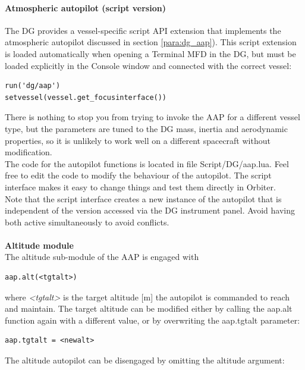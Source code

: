 \documentclass[Orbiter User Manual.tex]{subfiles}
\begin{document}
\paragraph{Atmospheric autopilot (script version)}
The DG provides a vessel-specific script API extension that implements the atmospheric autopilot discussed in section \ref{para:dg_aap}). This script extension is loaded automatically when opening a Terminal MFD in the DG, but must be loaded explicitly in the Console window and connected with the correct vessel:

\begin{lstlisting}[language=OSFS]
run('dg/aap')
setvessel(vessel.get_focusinterface())
\end{lstlisting}

\noindent
There is nothing to stop you from trying to invoke the AAP for a different vessel type, but the parameters are tuned to the DG mass, inertia and aerodynamic properties, so it is unlikely to work well on a different spacecraft without modification.\\
The code for the autopilot functions is located in file Script/DG/aap.lua. Feel free to edit the code to modify the behaviour of the autopilot. The script interface makes it easy to change things and test them directly in Orbiter.\\
Note that the script interface creates a new instance of the autopilot that is independent of the version accessed via the DG instrument panel. Avoid having both active simultaneously to avoid conflicts.\\
\\
\textbf{Altitude module}\\
The altitude sub-module of the AAP is engaged with

\begin{lstlisting}[language=OSFS]
aap.alt(<tgtalt>)
\end{lstlisting}

\noindent
where \textit{<tgtalt>} is the target altitude [m] the autopilot is commanded to reach and maintain. The target altitude can be modified either by calling the aap.alt function again with a different value, or by overwriting the aap.tgtalt parameter:

\begin{lstlisting}[language=OSFS]
aap.tgtalt = <newalt>
\end{lstlisting}

\noindent
The altitude autopilot can be disengaged by omitting the altitude argument:
\end{document}
